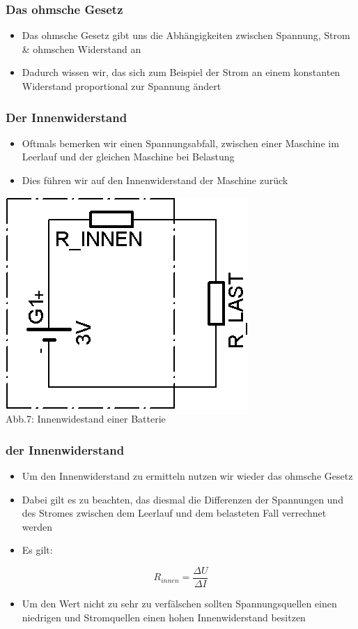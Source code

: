 \begin{frame}
	\frametitle{Das ohmsche Gesetz}
	\begin{itemize}
		\item	Das ohmsche Gesetz gibt uns die Abhängigkeiten zwischen Spannung, Strom \& ohmschen Widerstand an
		\item	Dadurch wissen wir, das sich zum Beispiel der Strom an einem konstanten Widerstand proportional zur Spannung ändert
	\end{itemize}
\end{frame}

\begin{frame}
	\frametitle{Der Innenwiderstand}
	\begin{itemize}
		\item	Oftmals bemerken wir einen Spannungsabfall, zwischen einer Maschine im Leerlauf und der gleichen Maschine bei Belastung
		\item	Dies führen wir auf den Innenwiderstand der Maschine zurück
	\end{itemize}
	\begin{center}
 		\includegraphics[scale=1.4]{e03/Innenwiderstand.png}\\
 		\small{Abb.7: Innenwidestand einer Batterie}
 	\end{center}
\end{frame}

\begin{frame}
	\frametitle{der Innenwiderstand}
	\begin{itemize}
		\item	Um den Innenwiderstand zu ermitteln nutzen wir wieder das ohmsche Gesetz
		\item	Dabei gilt es zu beachten, das diesmal die Differenzen der Spannungen und des Stromes zwischen dem Leerlauf und dem belasteten Fall verrechnet werden
		\item	Es gilt:
	\end{itemize}
	\begin{equation}
		R_{innen} = \frac{\Delta U}{\Delta I}
	\end{equation}
	\begin{itemize}
		\item	Um den Wert nicht zu sehr zu verfälschen sollten Spannungsquellen einen niedrigen und Stromquellen einen hohen Innenwiderstand besitzen
	\end{itemize}
\end{frame}


